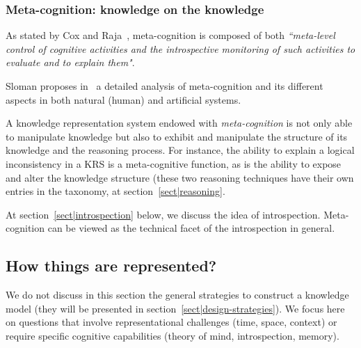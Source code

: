 
\subsubsection{Meta-cognition: knowledge on the knowledge}

As stated by Cox and Raja~\cite{Cox2007}, meta-cognition is composed of both
\emph{``meta-level control of cognitive activities and the introspective
monitoring of such activities to evaluate and to explain them"}.

Sloman proposes in~\cite{Sloman2011} a detailed analysis of meta-cognition and
its different aspects in both natural (human) and artificial systems.

A knowledge representation system endowed with \emph{meta-cognition} is not
only able to manipulate knowledge but also to exhibit and manipulate the
structure of its knowledge and the reasoning process. For instance, the ability
to explain a logical inconsistency in a KRS is a meta-cognitive function, as is
the ability to expose and alter the knowledge structure (these two reasoning
techniques have their own entries in the taxonomy, at
section~\ref{sect|reasoning}.

At section~\ref{sect|introspection} below, we discuss the idea of
introspection.  Meta-cognition can be viewed as the technical facet of the
introspection in general.


\subsection{How things are represented?}
\label{sect|higher-level-domain-representation}

We do not discuss in this section the general strategies to construct a
knowledge model (they will be presented in
section~\ref{sect|design-strategies}). We focus here on questions that involve
representational challenges (time, space, context) or require specific
cognitive capabilities (theory of mind, introspection, memory).

\begin{scriptsize}
\begin{center}
\end{center}
\end{scriptsize}

